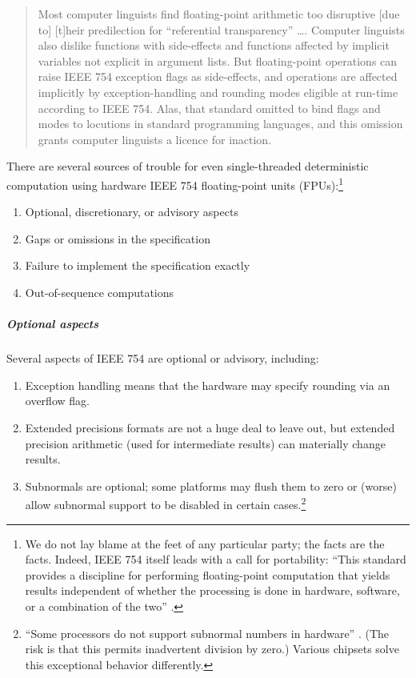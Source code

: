 \documentclass[twoside]{article}
\begin{document}
\begin{quote}
Most computer linguists find floating-point arithmetic too disruptive [due to] [t]heir predilection for “referential transparency” ….  Computer linguists also dislike functions with side-effects and functions affected by implicit variables not explicit in argument lists. But floating-point operations can raise IEEE 754 exception flags as side-effects, and operations are affected implicitly by exception-handling and rounding modes eligible at run-time according to IEEE 754. Alas, that standard omitted to bind flags and modes to locutions in standard programming languages, and this omission grants computer linguists a licence for inaction.  \citep{Kahan1997}
\end{quote}

There are several sources of trouble for even single-threaded deterministic computation using hardware IEEE 754 floating-point units (FPUs):\footnote{We do not lay blame at the feet of any particular party; the facts are the facts.  Indeed, IEEE 754 itself leads with a call for portability:  “This standard provides a discipline for performing floating-point computation that yields results independent of whether the processing is done in hardware, software, or a combination of the two” \citep{IEEE754-2008}.}

\begin{enumerate}
  \item  Optional, discretionary, or advisory aspects
  \item  Gaps or omissions in the specification
  \item  Failure to implement the specification exactly
  \item  Out-of-sequence computations
\end{enumerate}

\subparagraph{Optional aspects}

Several aspects of IEEE 754 are optional or advisory, including:

\begin{enumerate}
  \item  Exception handling means that the hardware may specify rounding via an overflow flag.
  \item  Extended precisions formats are not a huge deal to leave out, but extended precision arithmetic (used for intermediate results) can materially change results.
  \item  Subnormals are optional; some platforms may flush them to zero or (worse) allow subnormal support to be disabled in certain cases.\footnote{“Some processors do not support subnormal numbers in hardware” \citep[p.~338]{Jones2008}.  (The risk is that this permits inadvertent division by zero.)  Various chipsets solve this exceptional behavior differently.}
\end{enumerate}
\end{document}
